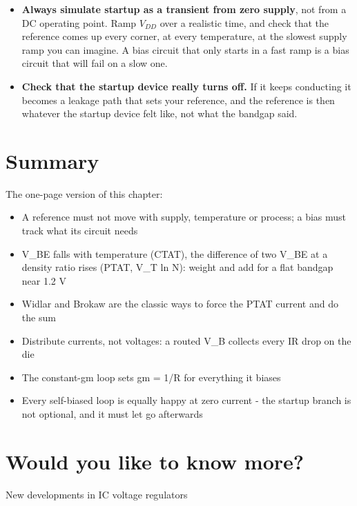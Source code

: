 \begin{itemize}
\tightlist
\item
  \textbf{Always simulate startup as a transient from zero supply}, not
  from a DC operating point. Ramp \(V_{DD}\) over a realistic time, and
  check that the reference comes up every corner, at every temperature,
  at the slowest supply ramp you can imagine. A bias circuit that only
  starts in a fast ramp is a bias circuit that will fail on a slow one.
\item
  \textbf{Check that the startup device really turns off.} If it keeps
  conducting it becomes a leakage path that sets your reference, and the
  reference is then whatever the startup device felt like, not what the
  bandgap said.
\end{itemize}

\section{Summary}\label{summary}

The one-page version of this chapter:

\begin{itemize}
\tightlist
\item
  A reference must not move with supply, temperature or process; a bias
  must track what its circuit needs
\item
  V\_BE falls with temperature (CTAT), the difference of two V\_BE at a
  density ratio rises (PTAT, V\_T ln N): weight and add for a flat
  bandgap near 1.2 V
\item
  Widlar and Brokaw are the classic ways to force the PTAT current and
  do the sum
\item
  Distribute currents, not voltages: a routed V\_B collects every IR
  drop on the die
\item
  The constant-gm loop sets gm = 1/R for everything it biases
\item
  Every self-biased loop is equally happy at zero current - the startup
  branch is not optional, and it must let go afterwards
\end{itemize}

\section{Would you like to know
more?}\label{would-you-like-to-know-more}

New developments in IC voltage regulators

